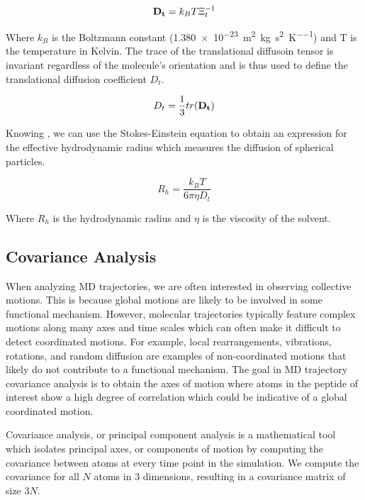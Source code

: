 \begin{equation}
\mathbf{D_{t}} = k_BT\Xi_{t}^{-1}
\end{equation}

Where $k_B$ is the Boltzmann constant (\SI{1.380e-23}{\square\metre\kilo\gram\per\square\second\per\kelvin}) and T is the temperature in Kelvin. The trace of the translational diffusoin tensor is invariant regardless of the molecule's orientation and is thus used to define the translational diffusion coefficient $D_t$.

\begin{equation}
D_t = \frac{1}{3}tr(\mathbf{D_t})
\end{equation}

Knowing \diffusion, we can use the Stokes-Einstein equation to obtain an expression for the effective hydrodynamic radius which measures the diffusion of spherical particles.

\begin{equation}
R_h = \frac{k_{B}T}{6\pi \eta D_{t}}
\end{equation}

Where $R_h$ is the hydrodynamic radius and $\eta$ is the viscosity of the solvent.

\subsection{Covariance Analysis}

When analyzing MD trajectories, we are often interested in observing collective motions. This is because global motions are likely to be involved in some functional mechanism. However, molecular trajectories typically feature complex motions along many axes and time scales which can often make it difficult to detect coordinated motions. For example, local rearrangements, vibrations, rotations, and random diffusion are examples of non-coordinated motions that likely do not contribute to a functional mechanism. The goal in MD trajectory covariance analysis is to obtain the axes of motion where atoms in the peptide of interest show a high degree of correlation which could be indicative of a global coordinated motion. 

Covariance analysis, or principal component analysis is a mathematical tool which isolates principal axes, or components of motion by computing the covariance between atoms at every time point in the simulation. We compute the covariance for all $N$ atoms in $3$ dimensions, resulting in a covariance matrix of size $3N$.

